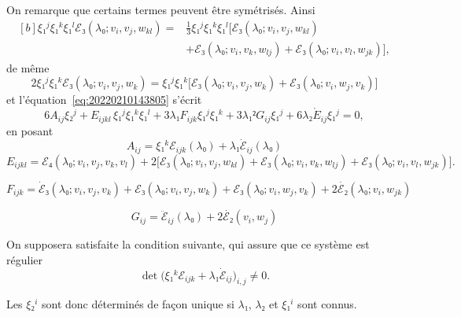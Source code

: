 \documentclass[12pt, final]{amsart}
\begin{document}
On remarque que certains termes peuvent être symétrisés. Ainsi
\begin{equation}
  \begin{aligned}[b]
    ξ₁^jξ₁^kξ₁^lℰ₃(λ₀; v_i, v_j, w_{kl})={}&\tfrac13ξ₁^jξ₁^kξ₁^l\bigl[
    ℰ₃(λ₀; v_i, v_j, w_{kl})\\
    &+ℰ₃(λ₀; v_i, v_k, w_{lj})+ℰ₃(λ₀; v_i, v_l, w_{jk})\bigr],
  \end{aligned}
\end{equation}
de même
\begin{equation}
  2ξ₁^jξ₁^kℰ₃(λ₀; v_i, v_j, w_k)=ξ₁^jξ₁^k\bigl[ℰ₃(λ₀; v_i, v_j, w_k)
  +ℰ₃(λ₀; v_i, w_j, v_k)\bigr]
\end{equation}
et l'équation~\eqref{eq:20220210143805} s'écrit
\begin{equation}
\label{eq:20220216141706}
  6A_{ij}ξ₂^j+E_{ijkl}\,ξ₁^jξ₁^kξ₁^l+3λ₁F_{ijk}ξ₁^jξ₁^k+3λ₁²G_{ij}ξ₁^j
  +6λ₂\mathring{E}_{ij}ξ₁^j=0,
\end{equation}
en posant
\begin{equation}
  A_{ij}=ξ₁^kℰ_{ijk}(λ₀)+λ₁\dot{ℰ}_{ij}(λ₀)
\end{equation}
\begin{equation}
  E_{ijkl}=ℰ₄(λ₀; v_i, v_j, v_k, v_l)+2\bigl[ℰ₃(λ₀; v_i, v_j, w_{kl})
  +ℰ₃(λ₀; v_i, v_k, w_{lj})+ℰ₃(λ₀; v_i, v_l, w_{jk})\bigr].
\end{equation}

\begin{equation}
  F_{ijk}=\dot{ℰ}₃(λ₀; v_i, v_j, v_k)+ℰ₃(λ₀; v_i, v_j, w_k)
  +ℰ₃(λ₀; v_i, w_j, v_k)+2\dot{ℰ₂}(λ₀; v_i, w_{jk})
\end{equation}

\begin{equation}
  G_{ij}=\ddot{ℰ}_{ij}(λ₀)+2\dot{ℰ₂}(v_i, w_j)
\end{equation}

On supposera satisfaite la condition suivante, qui assure que ce système est régulier
\begin{equation}
  \det\bigl(ξ₁^kℰ_{ijk}+λ₁\dot{ℰ}_{ij}\bigr)_{i,j}\neq0.
\end{equation}

Les \(ξ₂^i\) sont donc déterminés de façon unique si \(λ₁\), \(λ₂\) et \(ξ₁^i\)
sont connus.
\end{document}
